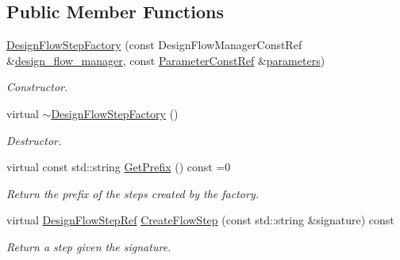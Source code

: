\subsection*{Public Member Functions}
\begin{DoxyCompactItemize}
\item 
\hyperlink{classDesignFlowStepFactory_aeedfbeb38320101d970256e261e98c6f}{Design\+Flow\+Step\+Factory} (const Design\+Flow\+Manager\+Const\+Ref \&\hyperlink{classDesignFlowStepFactory_ae7854875d87ed8d2fb4d82b2fa017b79}{design\+\_\+flow\+\_\+manager}, const \hyperlink{Parameter_8hpp_a37841774a6fcb479b597fdf8955eb4ea}{Parameter\+Const\+Ref} \&\hyperlink{classDesignFlowStepFactory_ab2c8bba23db9f4066e1a27ee7157c2de}{parameters})
\begin{DoxyCompactList}\small\item\em Constructor. \end{DoxyCompactList}\item 
virtual \hyperlink{classDesignFlowStepFactory_ad010d39c0b8c26a9889984526c8f4b17}{$\sim$\+Design\+Flow\+Step\+Factory} ()
\begin{DoxyCompactList}\small\item\em Destructor. \end{DoxyCompactList}\item 
virtual const std\+::string \hyperlink{classDesignFlowStepFactory_a52abfc00c170b5a63e84431b75eb698e}{Get\+Prefix} () const =0
\begin{DoxyCompactList}\small\item\em Return the prefix of the steps created by the factory. \end{DoxyCompactList}\item 
virtual \hyperlink{design__flow__step_8hpp_a9dd6b4474ddf52d41a78b1aaa12ae6c8}{Design\+Flow\+Step\+Ref} \hyperlink{classDesignFlowStepFactory_af65c5bc8971c3ae43e0f4b6fa183c1af}{Create\+Flow\+Step} (const std\+::string \&signature) const
\begin{DoxyCompactList}\small\item\em Return a step given the signature. \end{DoxyCompactList}\end{DoxyCompactItemize}
